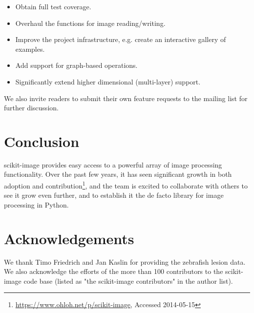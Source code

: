 \documentclass[fleqn,12pt]{wlpeerj}
\begin{document}
\begin{itemize}
    \item Obtain full test coverage.
    \item Overhaul the functions for image reading/writing.
    \item Improve the project infrastructure, e.g. create an interactive
        gallery of examples.
    \item Add support for graph-based operations.
    \item Significantly extend higher dimensional (multi-layer) support.
\end{itemize}

We also invite readers to submit their own feature requests to the mailing list
for further discussion.


\section*{Conclusion}
\label{sec:conclusion}

scikit-image provides easy access to a powerful array of image processing functionality. Over the past few years, it has seen significant growth in both adoption and contribution\footnote{\url{https://www.ohloh.net/p/scikit-image}, Accessed 2014-05-15}, and the team is excited to collaborate with others to see it grow even further, and to establish it the de facto library for image processing in Python.



\section*{Acknowledgements}
\label{sec:acknowledgements}

We thank Timo Friedrich and Jan Kaslin for providing the zebrafish lesion data.
We also acknowledge the efforts of the more than 100 contributors to the
scikit-image code base (listed as "the scikit-image contributors" in the
author list).



\end{document}
